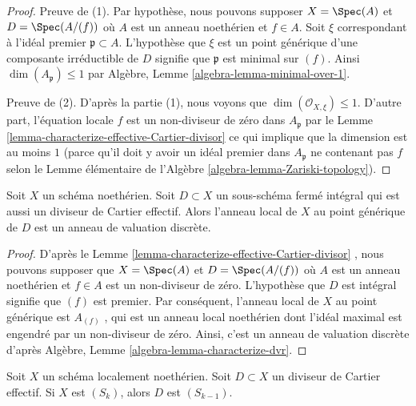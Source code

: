 \begin{proof}
Preuve de (1). Par hypothèse, nous pouvons supposer  $X = \Spec(A)$  et  $D = \Spec(A/(f))$ 
où  $A$  est un anneau noethérien et  $f \in A$. Soit  $\xi$ 
correspondant à l'idéal premier  $\mathfrak p \subset A$. L'hypothèse que  $\xi$  est un
point générique d'une composante irréductible de  $D$  signifie que
 $\mathfrak p$  est minimal sur  $(f)$. Ainsi  $\dim(A_\mathfrak p) \leq 1$  par Algèbre, Lemme
 \ref{algebra-lemma-minimal-over-1}.

\medskip\noindent
Preuve de (2). D'après la partie (1), nous voyons que  $\dim(\mathcal{O}_{X, \xi}) \leq 1$. D'autre part,
l'équation locale  $f$  est un non-diviseur de zéro dans  $A_\mathfrak p$  par le Lemme
 \ref{lemma-characterize-effective-Cartier-divisor}  ce qui implique que la dimension est au moins  $1$  (parce
qu'il doit y avoir un idéal premier dans  $A_\mathfrak p$  ne contenant pas  $f$
selon le Lemme élémentaire de l'Algèbre  \ref{algebra-lemma-Zariski-topology}).
\end{proof}

\begin{lemma}
\label{lemma-integral-effective-Cartier-divisor-dvr}
Soit  $X$  un schéma noethérien. Soit  $D \subset X$  un sous-schéma fermé
intégral qui est aussi un diviseur de Cartier effectif. Alors l'anneau local de
 $X$  au point générique de  $D$  est un anneau de valuation
discrète.
\end{lemma}

\begin{proof}
D'après le Lemme  \ref{lemma-characterize-effective-Cartier-divisor} , nous pouvons supposer que  $X = \Spec(A)$  et
 $D = \Spec(A/(f))$  où  $A$  est un anneau noethérien et  $f \in A$  est un
non-diviseur de zéro. L'hypothèse que  $D$  est intégral signifie que
 $(f)$  est premier. Par conséquent, l'anneau local de  $X$  au point
générique est  $A_{(f)}$ , qui est un anneau local noethérien dont l'idéal
maximal est engendré par un non-diviseur de zéro. Ainsi, c'est un anneau de
valuation discrète d'après Algèbre, Lemme  \ref{algebra-lemma-characterize-dvr}.
\end{proof}

\begin{lemma}
\label{lemma-effective-Cartier-divisor-Sk}
Soit  $X$  un schéma localement noethérien. Soit  $D \subset X$  un diviseur
de Cartier effectif. Si  $X$  est  $(S_k)$, alors  $D$  est
 $(S_{k - 1})$.
\end{lemma}

